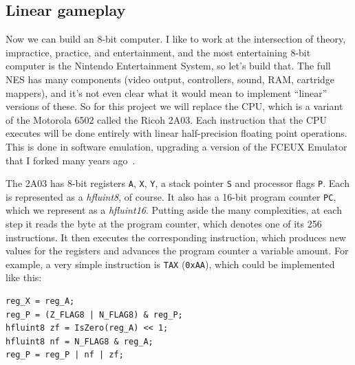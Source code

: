 \documentclass[twocolumn]{article}
\renewcommand\comment[1]{}
\begin{document}
\comment{ OK! Summary to self for later: The tricks in the fluint8
  paper work for integral values, just like my fluint8.h. The graphs
  are a bit misleading in this sense. In particular (see old.cc), the
  endpoints of the intervals for the fmod function are

\begin{lstlisting}
 c3800000 -> c3800000 (-256 -> -256)
 bf000080 -> 00000000 (-0.50000762939 -> 0)
 437f8001 -> 43800000 (255.50001526 -> 256)
 43ffc000 -> 44000000 (511.5 -> 512)
\end{lstlisting}

So it works great for its purpose, but not if we insist on intervals like [0, 0.125).
}

\subsection{Linear gameplay} \label{sec:sixtyfive}

Now we can build an 8-bit computer. I like to work at the intersection
of theory, impractice, practice, and entertainment, and the most
entertaining 8-bit computer is the Nintendo Entertainment System, so
let's build that. The full NES has many components (video output,
controllers, sound, RAM, cartridge mappers), and it's not even clear
what it would mean to implement ``linear'' versions of these. So for
this project we will replace the CPU, which is a variant of the Motorola
6502 called the Ricoh 2A03. Each instruction that the CPU executes
will be done entirely with linear half-precision floating point
operations. This is done in software emulation, upgrading a version of
the FCEUX Emulator~\cite{FCEUX} that I forked many years
ago~\cite{murphy2013first}.

The 2A03 has 8-bit registers {\tt A}, {\tt X}, {\tt Y}, a stack pointer {\tt S}
and processor flags {\tt P}. Each is represented as a {\it hfluint8}, of course.
It also has a 16-bit program counter {\tt PC}, which we represent as a {\it hfluint16}.
Putting aside the many complexities, at each step it reads the byte at
the program counter, which denotes one of its 256 instructions. It then executes
the corresponding instruction, which produces new values for the registers
and advances the program counter a variable amount. For example, a very simple
instruction is {\tt TAX} ({\tt 0xAA}), which could be implemented like this:

\begin{lstlisting}
reg_X = reg_A;
reg_P = (Z_FLAG8 | N_FLAG8) & reg_P;
hfluint8 zf = IsZero(reg_A) << 1;
hfluint8 nf = N_FLAG8 & reg_A;
reg_P = reg_P | nf | zf;
\end{lstlisting}
\end{document}
